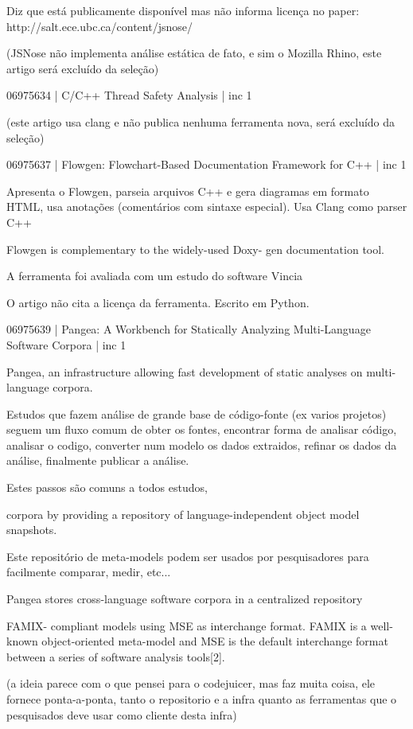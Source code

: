 \documentclass[12pt]{article}
\begin{document}
Diz que está publicamente disponível mas não informa licença no paper:
http://salt.ece.ubc.ca/content/jsnose/

(JSNose não implementa análise estática de fato, e sim o Mozilla Rhino, este
artigo será excluído da seleção)

06975634 | C/C++ Thread Safety Analysis | inc 1

(este artigo usa clang e não publica nenhuma ferramenta nova, será excluído da
seleção)

06975637 | Flowgen: Flowchart-Based Documentation Framework for C++ | inc 1

Apresenta o Flowgen, parseia arquivos C++ e gera diagramas em formato HTML, usa
anotações (comentários com sintaxe especial). Usa Clang como parser C++

Flowgen is complementary to the widely-used Doxy-
gen documentation tool.

A ferramenta foi avaliada com um estudo do software Vincia

O artigo não cita a licença da ferramenta. Escrito em Python.

06975639 | Pangea: A Workbench for Statically Analyzing Multi-Language Software Corpora | inc 1

Pangea,
an infrastructure allowing fast
development of static analyses on multi-language corpora.

Estudos que fazem análise de grande base de código-fonte (ex varios projetos)
seguem um fluxo comum de obter os fontes, encontrar forma de analisar código,
analisar o codigo, converter num modelo os dados extraidos, refinar os dados
da análise, finalmente publicar a análise.

Estes passos são comuns a todos estudos, 

corpora by providing a
repository of language-independent object model snapshots.

Este repositório de meta-models podem ser usados por pesquisadores para
facilmente comparar, medir, etc...

Pangea stores cross-language software corpora in a centralized repository

FAMIX-
compliant models using MSE as interchange format.
FAMIX is a well-known object-oriented meta-model and
MSE is the default interchange format between a series
of software analysis tools[2].

(a ideia parece com o que pensei para o codejuicer, mas faz muita coisa, ele
fornece ponta-a-ponta, tanto o repositorio e a infra quanto as ferramentas que
o pesquisados deve usar como cliente desta infra)
\end{document}
